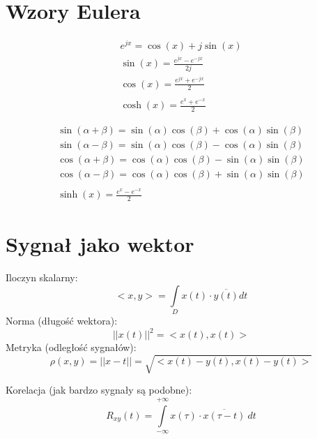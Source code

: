 \section{Wzory Eulera}
% 
\begin{multicols}{2}
    \begin{gather*}
        e^{jx} = \cos{(x)} + j\sin{(x)}\\
        \sin{(x)} = \frac{e^{jx}-e^{-jx}}{2j}\\
        \cos{(x)} = \frac{e^{jx}+e^{-jx}}{2}\\\\
        \cosh{(x)} = \frac{e^x+e^{-x}}{2}
    \end{gather*}

    \begin{gather*}
        \sin{(\alpha+\beta)} = \sin{(\alpha)}\cos{(\beta)} + \cos{(\alpha)}\sin{(\beta)}\\
        \sin{(\alpha-\beta)} = \sin{(\alpha)}\cos{(\beta)} - \cos{(\alpha)}\sin{(\beta)}\\
        \cos{(\alpha+\beta)} = \cos{(\alpha)}\cos{(\beta)} - \sin{(\alpha)}\sin{(\beta)}\\
        \cos{(\alpha-\beta)} = \cos{(\alpha)}\cos{(\beta)} + \sin{(\alpha)}\sin{(\beta)}
        \\\\
        \sinh{(x)}=\frac{e^x-e^{-x}}{2}
    \end{gather*}
\end{multicols}


\section{Sygnał jako wektor}
    Iloczyn skalarny:
    \begin{equation*}
        <x, y> = \int\limits_{D} x(t) \cdot \overline{y(t)} dt
    \end{equation*}
    Norma (długość wektora):
    \begin{equation*}
        ||x(t)||^2 = <x(t), x(t)>
    \end{equation*}
    Metryka (odległość sygnałów):
    \begin{equation*}
        \rho(x,y) = ||x-t|| = \sqrt{<x(t)-y(t), x(t)-y(t)>}
    \end{equation*}

    \noindent
    Korelacja (jak bardzo sygnały są podobne):
    \begin{equation*}
        R_{xy}(t) = \int\limits_{-\infty}^{+\infty}x(\tau)\cdot \overline{x(\tau-t)}\ dt
    \end{equation*}

